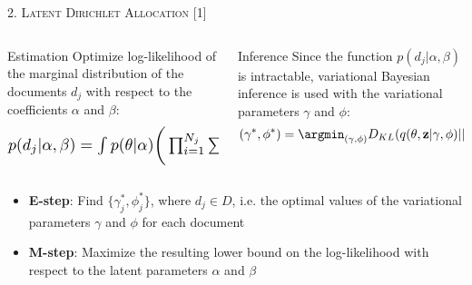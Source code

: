 \documentclass[fleqn,final]{beamer}
\begin{document}
\begin{frame}
\begin{columns}[t]
\begin{column}{.50\linewidth}
\begin{block}{\rule[-2.5mm]{0cm}{1cm}\textsc{2. Latent Dirichlet Allocation [1]}}
\begin{columns}[t]
\begin{column}{.47\linewidth}
{\small 
\vspace{-1.3cm}	
\begin{block}{\small{Estimation}}
\vspace{0.2cm}	
Optimize log-likelihood of the marginal distribution of the documents $d_j$ with respect to the coefficients $\alpha$ and $\beta$:
\small{
\begin{align*}
    \resizebox{0.95\hsize}{!}{$p(d_j|\alpha, \beta) = \int p(\theta|\alpha) \bigg(\prod_{i=1}^{N_j}\sum_{z_{j,i}} p(z_{j,i}|\theta)p(w_{j,i}|z_{j,i}, \beta)\bigg) \,d\theta$}
\end{align*}
}

\end{block}
}
\end{column}			

\begin{column}{.47\linewidth}
{\small 			
\vspace{-1.3cm}	
\begin{block}{\small{Inference}}
Since the function $p(d_j|\alpha, \beta)$ is intractable, variational Bayesian inference is used with the variational parameters $\gamma$ and $\phi$:
\small{
\begin{align*}
    (\gamma^*, \phi^*) = \argmin_{(\gamma, \phi)} D_{KL}(q(\theta, \textbf{z}|\gamma, \phi)||p(\theta, \textbf{z}|\textbf{d}, \alpha, \beta))
\end{align*}
}

\end{block}
}
\end{column}

\end{columns}

{\small
{\color{blue}{Variational expectation-maximization (VEM):}}
\begin{itemize}
    \item \textbf{E-step}: Find $\{\gamma^*_j, \phi^*_j\}$, where $d_j \in D$, i.e. the optimal values of the variational parameters $\gamma$ and $\phi$ for each document
    \item \textbf{M-step}: Maximize the resulting lower bound on the log-likelihood with respect to the latent parameters $\alpha$ and $\beta$
\end{itemize}
}

\vspace{1cm}
        

\end{block}
\end{column}
\end{columns}
\end{frame}
\end{document}
